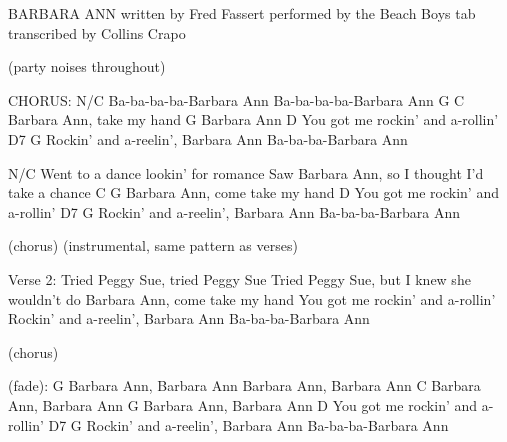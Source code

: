 BARBARA ANN
written by Fred Fassert
performed by the Beach Boys
tab transcribed by Collins Crapo 

(party noises throughout)

CHORUS:
N/C
Ba-ba-ba-ba-Barbara Ann
Ba-ba-ba-ba-Barbara Ann
        G            C
Barbara Ann, take my hand
        G
Barbara Ann
           D
You got me rockin' and a-rollin'
D7                             G
Rockin' and a-reelin', Barbara Ann
Ba-ba-ba-Barbara Ann

N/C
Went to a dance lookin' for romance
Saw Barbara Ann, so I thought I'd take a chance
        C                 G
Barbara Ann, come take my hand
           D
You got me rockin' and a-rollin'
D7                             G
Rockin' and a-reelin', Barbara Ann
Ba-ba-ba-Barbara Ann

(chorus)
(instrumental, same pattern as verses)

Verse 2:
Tried Peggy Sue, tried Peggy Sue
Tried Peggy Sue, but I knew she wouldn't do
Barbara Ann, come take my hand
You got me rockin' and a-rollin'
Rockin' and a-reelin', Barbara Ann
Ba-ba-ba-Barbara Ann

(chorus)

(fade):
G
Barbara Ann, Barbara Ann
Barbara Ann, Barbara Ann
C
Barbara Ann, Barbara Ann
G
Barbara Ann, Barbara Ann
           D
You got me rockin' and a-rollin'
D7                             G
Rockin' and a-reelin', Barbara Ann
Ba-ba-ba-Barbara Ann




